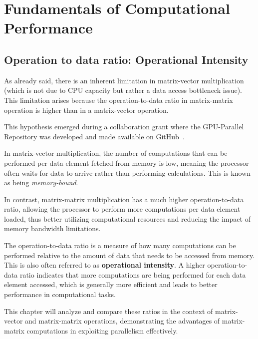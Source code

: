 
\chapter{Fundamentals of Computational Performance}
\label{ch::chapter2}

\vspace{-1cm}

\section{Operation to data ratio: Operational Intensity}

As already said, there is an inherent limitation in matrix-vector multiplication (which is not due to CPU capacity but rather a data access bottleneck issue). This limitation arises because the operation-to-data ratio in matrix-matrix operation is higher than in a matrix-vector operation.

This hypothesis emerged during a collaboration grant where the GPU-Parallel Repository was developed and made available on GitHub~\cite{jahrwork}.

In matrix-vector multiplication, the number of computations that can be performed per data element fetched from memory is low, meaning the processor often waits for data to arrive rather than performing calculations. This is known as being \textit{memory-bound}.

In contrast, matrix-matrix multiplication has a much higher operation-to-data ratio, allowing the processor to perform more computations per data element loaded, thus better utilizing computational resources and reducing the impact of memory bandwidth limitations.

The operation-to-data ratio is a measure of how many computations can be performed relative to the amount of data that needs to be accessed from memory. This is also often referred to as \textbf{operational intensity}. A higher operation-to-data ratio indicates that more computations are being performed for each data element accessed, which is generally more efficient and leads to better performance in computational tasks.

This chapter will analyze and compare these ratios in the context of matrix-vector and matrix-matrix operations, demonstrating the advantages of matrix-matrix computations in exploiting parallelism effectively.

\clearpage

